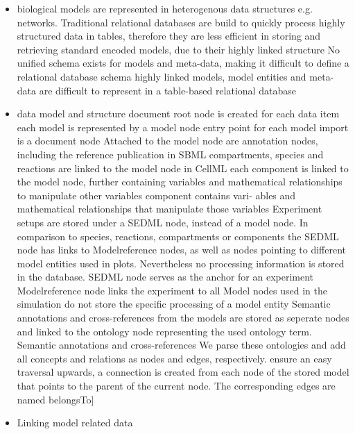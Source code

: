 \begin{itemize}
	\item \cite{Henkel2015} biological models are represented in heterogenous data structures e.g. networks. Traditional relational databases are build to quickly process highly structured data in tables, therefore they are less efficient in storing and retrieving standard encoded models, due to their highly linked structure
		\subitem \cite{Henkel2015} No unified schema exists for models and meta-data, making it difficult to define a relational database schema
		\subitem \cite{Henkel2015} highly linked models, model entities and meta-data are difficult to represent in a table-based relational database
	\item \masymos data model and structure
		\subitem \cite{Henkel2015} document root node is created for each data item
		\subitem each model is represented by a model node
			\subsubitem entry point for each model import is a document node
		\subitem \cite{Henkel2015} Attached to the model node are annotation nodes, including the reference publication
		\subitem in SBML compartments, species and reactions are linked to the model node
		\subitem in CellML each component is linked to the model node, further containing variables and mathematical relationships to manipulate other variables
			\subsubitem \cite{Henkel2015} component contains vari- ables and mathematical relationships that manipulate those variables
		\subitem Experiment setups are stored under a SEDML node, instead of a model node. In comparison to species, reactions, compartments or components the SEDML node has links to Modelreference nodes, as well as nodes pointing to different model entities used in plots. Nevertheless no processing information is stored in the database.
			\subsubitem \cite{Henkel2015} SEDML node serves as the anchor for an experiment
			\subsubitem \cite{Henkel2015} Modelreference node links the experiment to all Model nodes used in the simulation
			\subsubitem \cite{Henkel2015} do not store the specific processing of a model entity
		\subitem Semantic annotations and cross-references from the models are stored as seperate nodes and linked to the ontology node representing the used ontology term.
			\subsubitem \cite{Henkel2015} Semantic annotations and cross-references
			\subsubitem \cite{Henkel2015} We parse these ontologies and add all concepts and relations as nodes and edges, respectively.
		\subitem ensure an easy traversal upwards, a connection is created from each node of the stored model that points to the parent of the current node. The corresponding edges are named belongsTo]
	\item Linking model related data

\end{itemize}
